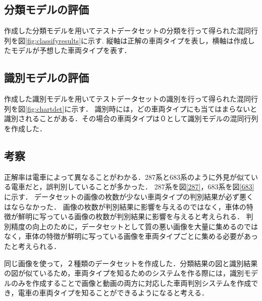 \begin{multicols*}{2}
\subsection{分類モデルの評価}
作成した分類モデルを用いてテストデータセットの分類を行って得られた混同行列を図\ref{fig:classifyresults}に示す.
縦軸は正解の車両タイプを表し，横軸は作成したモデルが予想した車両タイプを表す．

\subsection{識別モデルの評価}
作成した識別モデルを用いてテストデータセットの識別を行って得られた混同行列を図\ref{fig:chartdet}に示す．
識別時には，どの車両タイプにも当てはまらないと識別されることがある．その場合の車両タイプは０として識別モデルの混同行列を作成した．





\subsection{考察}
正解率は電車によって異なることがわかる．287系と683系のように外見が似ている電車だと，誤判別していることが多かった．
287系を図\ref{287}，683系を図\ref{683}に示す．
データセットの画像の枚数が少ない車両タイプの判別結果が必ず悪くはならなかった．
画像の枚数が判別結果に影響を与えるのではなく，車体の特徴が鮮明に写っている画像の枚数が判別結果に影響を与えると考えられる．
判別精度の向上のために，データセットとして質の悪い画像を大量に集めるのではなく，車体の特徴が鮮明に写っている画像を車両タイプごとに集める必要があったと考えられる．

同じ画像を使って，２種類のデータセットを作成した．分類結果の図と識別結果の図が似ているため，車両タイプを知るためのシステムを作る際には，識別モデルのみを作成することで画像と動画の両方に対応した車両判別システムを作成でき，電車の車両タイプを知ることができるようになると考える．


\end{multicols*}
